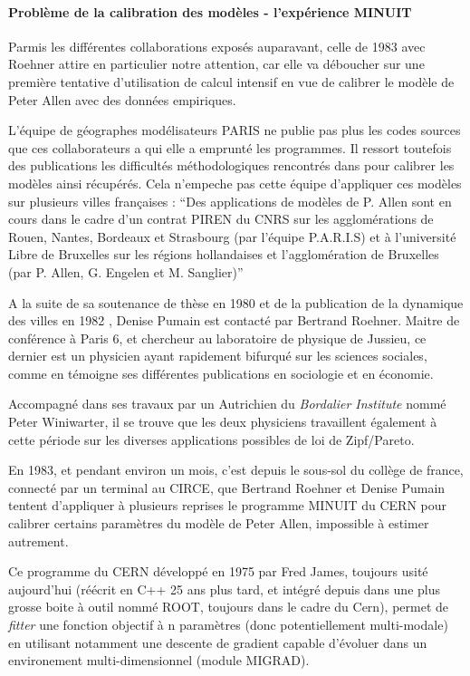 \paragraph{Problème de la calibration des modèles - l'expérience MINUIT}

Parmis les différentes collaborations exposés auparavant, celle de 1983 avec Roehner attire en particulier notre attention, car elle va déboucher sur une première tentative d’utilisation de calcul intensif en vue de calibrer le modèle de Peter Allen avec des données empiriques.

L'équipe de géographes modélisateurs PARIS ne publie pas plus les codes sources que ces collaborateurs a qui elle a emprunté les programmes. Il ressort toutefois des publications les difficultés méthodologiques rencontrés dans pour calibrer les modèles ainsi récupérés.  Cela n'empeche pas cette équipe d'appliquer ces modèles sur plusieurs villes françaises \autocite[134]{Pumain1984} : \enquote{Des applications de modèles de P. Allen sont en cours dans le cadre d'un contrat PIREN du CNRS sur les agglomérations de Rouen, Nantes, Bordeaux et Strasbourg (par l'équipe P.A.R.I.S) et à l'université Libre de Bruxelles sur les régions hollandaises et l'agglomération de Bruxelles (par P. Allen, G. Engelen et M. Sanglier)}

A la suite de sa soutenance de thèse en 1980 et de la publication de la dynamique des villes en 1982 \autocite{Pumain1982}, Denise Pumain est contacté par Bertrand Roehner. Maitre de conférence à Paris 6, et chercheur au laboratoire de physique de Jussieu, ce dernier est un physicien ayant rapidement bifurqué sur les sciences sociales, comme en témoigne ses différentes publications en sociologie et en économie.

Accompagné dans ses travaux par un Autrichien du \textit{Bordalier Institute} nommé Peter Winiwarter, il se trouve que les deux physiciens travaillent également à cette période sur les diverses applications possibles de loi de Zipf/Pareto.

En 1983, et pendant environ un mois, c’est depuis le sous-sol du collège de france, connecté par un terminal au CIRCE, que Bertrand Roehner et Denise Pumain tentent d’appliquer à plusieurs reprises le programme MINUIT du CERN pour calibrer certains paramètres du modèle de Peter Allen, impossible à estimer autrement.

Ce programme du CERN développé en 1975 par Fred James, toujours usité aujourd’hui (réécrit en C++ 25 ans plus tard, et intégré depuis dans une plus grosse boite à outil nommé ROOT, toujours dans le cadre du Cern), permet de \textit{fitter} une fonction objectif à n paramètres (donc potentiellement multi-modale) en utilisant notamment une descente de gradient capable d’évoluer  dans un environement multi-dimensionnel (module MIGRAD).

